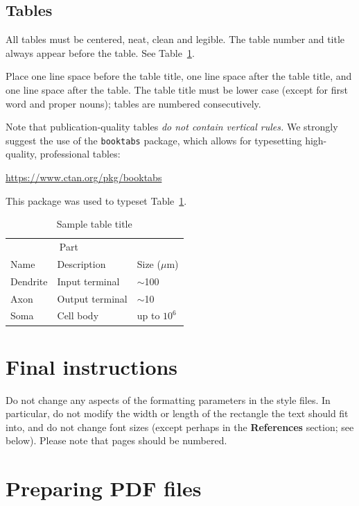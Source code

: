 \documentclass{article}
\begin{document}
\subsection{Tables}

All tables must be centered, neat, clean and legible.  The table
number and title always appear before the table.  See
Table~\ref{sample-table}.

Place one line space before the table title, one line space after the
table title, and one line space after the table. The table title must
be lower case (except for first word and proper nouns); tables are
numbered consecutively.

Note that publication-quality tables \emph{do not contain vertical
  rules.} We strongly suggest the use of the \verb+booktabs+ package,
which allows for typesetting high-quality, professional tables:
\begin{center}
  \url{https://www.ctan.org/pkg/booktabs}
\end{center}
This package was used to typeset Table~\ref{sample-table}.

\begin{table}[t]
  \caption{Sample table title}
  \label{sample-table}
  \centering
  \begin{tabular}{lll}
    \toprule
    \multicolumn{2}{c}{Part}                   \\
    \cmidrule{1-2}
    Name     & Description     & Size ($\mu$m) \\
    \midrule
    Dendrite & Input terminal  & $\sim$100     \\
    Axon     & Output terminal & $\sim$10      \\
    Soma     & Cell body       & up to $10^6$  \\
    \bottomrule
  \end{tabular}
\end{table}

\section{Final instructions}

Do not change any aspects of the formatting parameters in the style
files.  In particular, do not modify the width or length of the
rectangle the text should fit into, and do not change font sizes
(except perhaps in the \textbf{References} section; see below). Please
note that pages should be numbered.

\section{Preparing PDF files}
\end{document}
